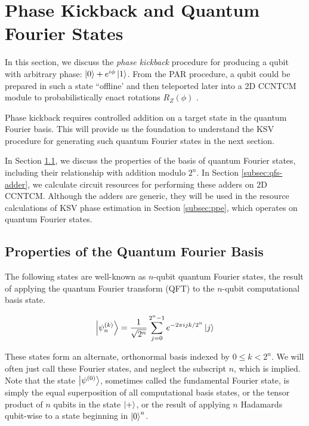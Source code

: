 \section{Phase Kickback and Quantum Fourier States}
\label{sec:qcompile-qfs}

In this section, we discuss the \emph{phase kickback} procedure for
producing a qubit with arbitrary phase: $\left\vert{0}\right\rangle + e^{i\phi}\left\vert{1}\right\rangle$.
From the PAR procedure, a qubit could be prepared in such a state
``offline' and then teleported later into a \textsf{2D CCNTCM} module to
probabilistically enact rotations $R_Z(\phi)$ \cite{Jones2012}.

Phase kickback requires controlled addition on a target state in 
the quantum Fourier basis. This will provide us the foundation
to understand the KSV procedure for generating such quantum Fourier
states in the next section.

In Section \ref{subsec:qfs-basis}, we discuss the properties of the
basis of quantum Fourier states, including their relationship with
addition modulo $2^n$. In Section \ref{subsec:qfs-adder},
we calculate circuit resources for performing these adders
on \textsf{2D CCNTCM}. Although the adders are generic, they will be
used in the resource calculations of KSV phase estimation in
Section \ref{subsec:ppe}, which operates on quantum Fourier states.

\subsection{Properties of the Quantum Fourier Basis}
\label{subsec:qfs-basis}

The following states are well-known as $n$-qubit quantum Fourier states,
the result of applying the quantum Fourier transform (QFT)
to the $n$-qubit computational basis state. 

\begin{equation}
\left\vert{\psi^{(k)}_{n}}\right\rangle = \frac{1}{\sqrt{2^n}} \sum_{j=0}^{2^n-1}
e^{-2\pi i j k / 2^n} \left\vert{j}\right\rangle
\end{equation}

These states form an alternate, orthonormal basis indexed by
$0 \le k < 2^n$. We will often just call these Fourier states,
and neglect the subscript $n$, which is implied.
Note that the state $\left\vert{\psi^{(0)}}\right\rangle$, sometimes
called the fundamental Fourier state, is simply the equal superposition
of all computational basis states, or the tensor product of
$n$ qubits in the state $\left\vert{+}\right\rangle$, or the result of applying
$n$ Hadamards qubit-wise to a state beginning in $\left\vert{0}\right\rangle^n$.

